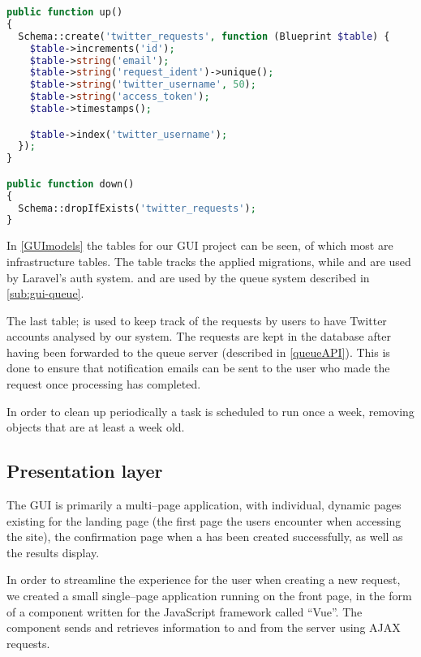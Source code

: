 \begin{minipage}[H]{\linewidth}
\begin{lstlisting}[caption = Example of a migration in Laravel, label =
PhpMigrationEx, language = PHP, style = PHP]
public function up()
{
  Schema::create('twitter_requests', function (Blueprint $table) {
    $table->increments('id');
    $table->string('email');
    $table->string('request_ident')->unique();
    $table->string('twitter_username', 50);
    $table->string('access_token');
    $table->timestamps();

    $table->index('twitter_username');
  });
}

public function down()
{
  Schema::dropIfExists('twitter_requests');
}
\end{lstlisting}
\end{minipage}

In \autoref{GUImodels} the tables for our GUI project can be seen, of which
most are infrastructure tables. The table  tracks the applied
migrations, while  and  are used by Laravel's
auth system.  and  are used by the queue system
described in \autoref{sub:gui-queue}.\nl

The last table;  is used to keep track of the requests by
users to have Twitter accounts analysed by our system. The requests are kept in
the database after having been forwarded to the queue server (described in
\autoref{queueAPI}). This is done to ensure that notification emails can be
sent to the user who made the request once processing has completed.\nl

In order to clean up periodically a task is scheduled to run once a week,
removing  objects that are at least a week old.


\subsection{Presentation layer}
The \ac{GUI} is primarily a multi--page application, with individual,
dynamic pages existing for the landing page (the first page the users encounter
when accessing the site), the confirmation page when a  has
been created successfully, as well as the results display.\nl

In order to streamline the experience for the user when creating a new request,
we created a small single--page application running on the front page, in
the form of a component written for the JavaScript framework called ``Vue''. The
component sends and retrieves information to and from the server using
\ac{AJAX} requests.

